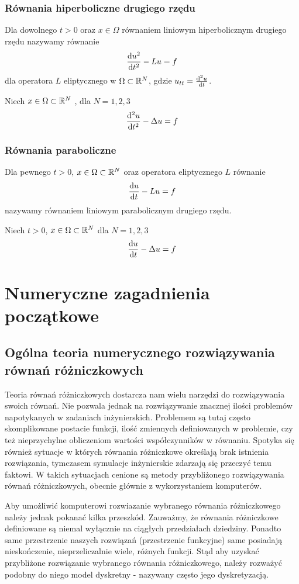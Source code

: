 \documentclass[12pt,a4paper]{report}
\begin{document}
\subsection{Równania hiperboliczne drugiego rzędu} 
Dla dowolnego $t>0$ oraz $ x \in \Omega $ równaniem liniowym hiperbolicznym drugiego rzędu nazywamy równanie 
$$
\ddx[u^2]{t^2} - Lu = f
$$ 
dla operatora $L$ eliptycznego w $\Omega \subset \setR^N$, gdzie $ u_{tt} = \ddx[^2u]{t}$.  
\begin{example}
Niech $x \in \Omega \subset \setR^N $ , dla $ N = 1,2,3$
$$
\ddx[^2u]{t^2} - \Delta u = f 
$$
\end{example}
\subsection{Równania paraboliczne}
Dla pewnego $t>0$, $x \in \Omega \subset \setR^N$ oraz operatora eliptycznego $L$ równanie
$$
\ddx[u]{t} -  Lu = f 
$$
nazywamy równaniem liniowym parabolicznym drugiego rzędu. 
\begin{example} 
Niech $t>0$, $x \in \Omega \subset \setR^N $ dla $ N = 1,2,3 $
$$
\ddx[u]{t} - \Delta u = f
$$
\end{example}

\chapter{Numeryczne zagadnienia początkowe}

\section{Ogólna teoria numerycznego rozwiązywania równań różniczkowych}

Teoria równań różniczkowych dostarcza nam wielu narzędzi do rozwiązywania swoich równań. Nie pozwala jednak na rozwiązywanie znacznej ilości problemów napotykanych w zadaniach inżynierskich. Problemem są tutaj często skomplikowane postacie funkcji, ilość zmiennych definiowanych w problemie, czy też nieprzychylne obliczeniom wartości współczynników w równaniu. Spotyka się również sytuacje w których równania różniczkowe określają brak istnienia rozwiązania, tymczasem symulacje inżynierskie zdarzają się przeczyć temu faktowi. W takich sytuacjach cenione są metody przybliżonego rozwiązywania równań różniczkowych, obecnie głównie z wykorzystaniem komputerów. 

Aby umożliwić komputerowi rozwiazanie wybranego równania różniczkowego należy jednak pokanać kilka przeszkód. Zauważmy, że równania różniczkowe definiowane są niemal wyłącznie na ciągłych przedziałach dziedziny. Ponadto same przestrzenie naszych rozwiązań (przestrzenie funkcyjne) same posiadają nieskończenie, nieprzeliczalnie wiele, różnych funkcji. Stąd aby uzyskać przybliżone rozwiązanie wybranego równania różniczkowego, należy rozważyć podobny do niego model dyskretny - nazywany często jego dyskretyzacją. 
\end{document}
